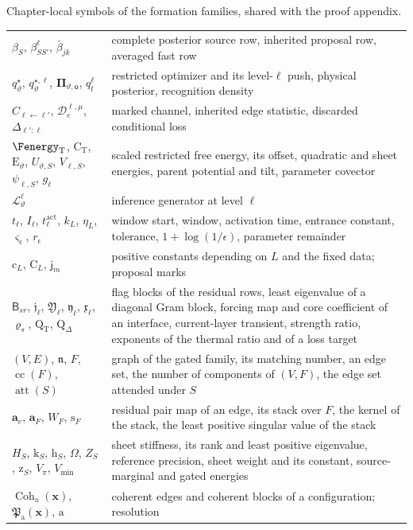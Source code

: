 \begin{sciencetable}{Chapter-local symbols of the formation families, shared with the proof appendix.}
\begin{tabularx}{\textwidth}{>{\raggedright\arraybackslash}p{}>{\raggedright\arraybackslash}X}
\(\beta_S\), \(\beta^\ell_{SS'}\), \(\bar\beta_{jk}\) & complete posterior source row, inherited proposal row, averaged fast row \\
\(q^\star_\vartheta\), \(q^{\star,\ell}_\vartheta\), \(\boldsymbol\Pi_{\vartheta,\mathsf o}\), \(q^\ell_t\) & restricted optimizer and its level-\(\ell\) push, physical posterior, recognition density \\
\(C_{\ell\leftarrow\ell'}\), \(\mathcal D^{\ell,\mu}_e\), \(\Delta_{\ell':\ell}\) & marked channel, inherited edge statistic, discarded conditional loss \\
\(\Fenergy_{\mathrm T}\), \(\mathrm C_{\mathrm T}\), \(\mathrm E_\vartheta\), \(U_{\vartheta,S}\), \(V_{\ell,S}\), \(\psi_{\ell,S}\), \(g_\ell\) & scaled restricted free energy, its offset, quadratic and sheet energies, parent potential and tilt, parameter covector \\
\(\mathscr L^\ell_\vartheta\) & inference generator at level \(\ell\) \\
\(t_\ell\), \(I_\ell\), \(t^{\mathrm{act}}_\ell\), \(k_L\), \(\eta_L\), \(\varsigma_\epsilon\), \(r_\epsilon\) & window start, window, activation time, entrance constant, tolerance, \(1+\log(1/\epsilon)\), parameter remainder \\
\(\mathrm c_L\), \(\mathrm C_L\), \(\mathsf j_m\) & positive constants depending on \(L\) and the fixed data; proposal marks \\
\(\mathsf B_{sr}\), \(\mathfrak j_\ell\), \(\mathfrak Y_\ell\), \(\mathfrak y_\ell\), \(\mathfrak x_\ell\), \(\varrho_s\), \(\mathrm Q_{\mathrm T}\), \(\mathrm Q_\Delta\) & flag blocks of the residual rows, least eigenvalue of a diagonal Gram block, forcing map and core coefficient of an interface, current-layer transient, strength ratio, exponents of the thermal ratio and of a loss target \\
\((V,E)\), \(\mathfrak n\), \(F\), \(\operatorname{cc}(F)\), \(\operatorname{att}(S)\) & graph of the gated family, its matching number, an edge set, the number of components of \((V,F)\), the edge set attended under \(S\) \\
\(\mathbf a_e\), \(\mathbf a_F\), \(W_F\), \(\mathrm s_F\) & residual pair map of an edge, its stack over \(F\), the kernel of the stack, the least positive singular value of the stack \\
\(H_S\), \(\mathrm k_S\), \(\mathrm h_S\), \(\Omega\), \(Z_S\), \(\mathrm z_S\), \(V_\pi\), \(V_{\min}\) & sheet stiffness, its rank and least positive eigenvalue, reference precision, sheet weight and its constant, source-marginal and gated energies \\
\(\operatorname{Coh}_{\mathrm a}(\mathbf x)\), \(\mathfrak P_{\mathrm a}(\mathbf x)\), \(\mathrm a\) & coherent edges and coherent blocks of a configuration; resolution \\
\bottomrule
\end{tabularx}
\end{sciencetable}

